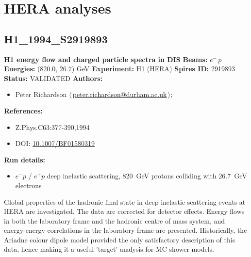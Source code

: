\clearpage


\section{HERA analyses}\subsection[H1\_1994\_S2919893]{H1\_1994\_S2919893\,\cite{Abt:1994ye}}
\textbf{H1 energy flow and charged particle spectra in DIS}\newline
\textbf{Beams:} $e^-$\,$p$ \newline
\textbf{Energies:} (820.0, 26.7) GeV \newline
\textbf{Experiment:} H1 (HERA) \newline
\textbf{Spires ID:} \href{http://www.slac.stanford.edu/spires/find/hep/www?rawcmd=key+2919893}{2919893}\newline
\textbf{Status:} VALIDATED\newline
\textbf{Authors:}
\begin{itemize}
  \item Peter Richardson $\langle\,$\href{mailto:peter.richardson@durham.ac.uk}{peter.richardson@durham.ac.uk}$\,\rangle$;
\end{itemize}
\textbf{References:}
\begin{itemize}
  \item Z.Phys.C63:377-390,1994
  \item DOI: \href{http://dx.doi.org/10.1007/BF01580319}{10.1007/BF01580319}
\end{itemize}
\textbf{Run details:}
\begin{itemize}

  \item $e^- p$ / $e^+ p$ deep inelastic scattering, 820~GeV protons colliding with 26.7~GeV electrons\end{itemize}

\noindent Global properties of the hadronic final state in deep inelastic scattering events at HERA are investigated. The data are corrected for detector effects. Energy flows in both the laboratory frame and the hadronic centre of mass system, and energy-energy correlations in the laboratory frame are presented.  Historically, the Ariadne colour dipole model provided the only satisfactory description of this data, hence making it a useful 'target' analysis for MC shower models.

